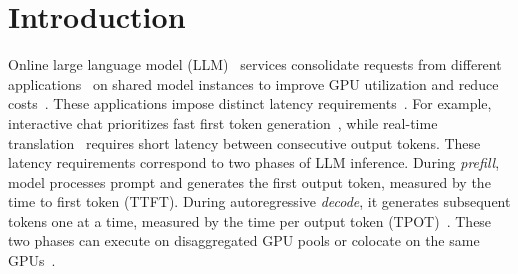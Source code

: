 \section{Introduction\label{sec:introduction}}

Online large language model (LLM)~\cite{vaswani2017attention,brown2020language} services consolidate requests from different applications~\cite{lin2024parrot} on shared model instances to improve GPU utilization and reduce costs~\cite{yu2022orca,kwon2023vllm}.
These applications impose distinct latency requirements~\cite{sun2024llumnix,goel2026qoserve,zhang2026jitserve}.
For example, interactive chat prioritizes fast first token generation~\cite{goel2026qoserve}, while real-time translation~\cite{zhang2026jitserve} requires short latency between consecutive output tokens.
These latency requirements correspond to two phases of LLM inference. During \emph{prefill}, model processes prompt and generates the first output token, measured by the time to first token (TTFT).
During autoregressive \emph{decode}, it generates subsequent tokens one at a time, measured by the time per output token (TPOT)~\cite{agrawal2024sarathi,zhong2024distserve}.
These two phases can execute on disaggregated GPU pools or colocate on the same GPUs~\cite{patel2024splitwise,qin2025mooncake,agrawal2024sarathi}.


